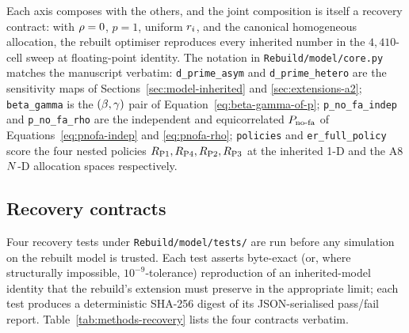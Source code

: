 Each axis composes with the others, and the joint composition is
itself a recovery contract: with $\rho = 0$, $p = 1$, uniform
$r_i$, and the canonical homogeneous allocation, the rebuilt
optimiser reproduces every inherited number in the
$4{,}410$-cell sweep at floating-point identity.  The notation in
\texttt{Rebuild/model/core.py} matches the manuscript verbatim:
\texttt{d\_prime\_asym} and \texttt{d\_prime\_hetero} are the
sensitivity maps of Sections~\ref{sec:model-inherited} and
\ref{sec:extensions-a2}; \texttt{beta\_gamma} is the
$(\beta, \gamma)$ pair of Equation~\eqref{eq:beta-gamma-of-p};
\texttt{p\_no\_fa\_indep} and \texttt{p\_no\_fa\_rho} are the
independent and equicorrelated $P_{\mathrm{no\text{-}fa}}$ of
Equations~\eqref{eq:pnofa-indep} and \eqref{eq:pnofa-rho};
\texttt{policies} and \texttt{er\_full\_policy} score the four nested
policies $R_{\mathrm{P1}}, R_{\mathrm{P4}}, R_{\mathrm{P2}}, R_{\mathrm{P3}}$ at the inherited 1-D and
the A8 $N$-D allocation spaces respectively.

\subsection{Recovery contracts}
\label{sec:methods-recovery}

Four recovery tests under \texttt{Rebuild/model/tests/} are run before
any simulation on the rebuilt model is trusted.  Each test asserts
byte-exact (or, where structurally impossible, $10^{-9}$-tolerance)
reproduction of an inherited-model identity that the rebuild's
extension must preserve in the appropriate limit; each test produces
a deterministic SHA-256 digest of its JSON-serialised pass/fail
report.  Table~\ref{tab:methods-recovery} lists the four contracts
verbatim.

